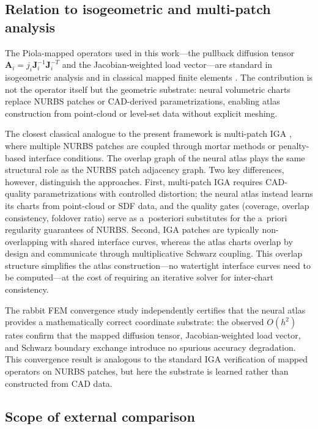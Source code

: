 \documentclass[sort&compress]{svjour3} %
\begin{document}
\subsection{Relation to isogeometric and multi-patch analysis}

The Piola-mapped operators used in this work---the pullback diffusion tensor $\mathbf{A}_i = j_i \mathbf{J}_i^{-1}\mathbf{J}_i^{-T}$ and the Jacobian-weighted load vector---are standard in isogeometric analysis \citep{hughes2005isogeometric,cottrell2009isogeometric} and in classical mapped finite elements \citep{ciarlet2002finite}. The contribution is not the operator itself but the geometric substrate: neural volumetric charts replace NURBS patches or CAD-derived parametrizations, enabling atlas construction from point-cloud or level-set data without explicit meshing.

The closest classical analogue to the present framework is multi-patch IGA \citep{brivadis2015isogeometric}, where multiple NURBS patches are coupled through mortar methods or penalty-based interface conditions. The overlap graph of the neural atlas plays the same structural role as the NURBS patch adjacency graph. Two key differences, however, distinguish the approaches. First, multi-patch IGA requires CAD-quality parametrizations with controlled distortion; the neural atlas instead learns its charts from point-cloud or SDF data, and the quality gates (coverage, overlap consistency, foldover ratio) serve as a~posteriori substitutes for the a~priori regularity guarantees of NURBS. Second, IGA patches are typically non-overlapping with shared interface curves, whereas the atlas charts overlap by design and communicate through multiplicative Schwarz coupling. This overlap structure simplifies the atlas construction---no watertight interface curves need to be computed---at the cost of requiring an iterative solver for inter-chart consistency.

The rabbit FEM convergence study independently certifies that the neural atlas provides a mathematically correct coordinate substrate: the observed $O(h^2)$ rates confirm that the mapped diffusion tensor, Jacobian-weighted load vector, and Schwarz boundary exchange introduce no spurious accuracy degradation. This convergence result is analogous to the standard IGA verification of mapped operators on NURBS patches, but here the substrate is learned rather than constructed from CAD data.

\subsection{Scope of external comparison}
\end{document}
